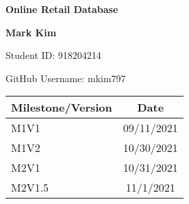 \begin{titlepage}
\begin{center}
	\vspace*{1cm}
	\Huge
	\textbf{Online Retail Database}
	
	\vspace{1.5cm}
	\LARGE
	\textbf{Mark Kim}
	
	\Large
	Student ID: 918204214
	
	GitHub Username: mkim797
	
	\large
	\vspace{1cm}
	\begin{tabular}{ | l | c | }
		\hline
		\textbf{Milestone/Version} & \textbf{Date}\\
		\hline
		M1V1 & 09/11/2021\\
		M1V2 & 10/30/2021\\
		M2V1 & 10/31/2021\\
		M2V1.5 & 11/1/2021\\
		\hline
	\end{tabular}

\end{center}
\end{titlepage}